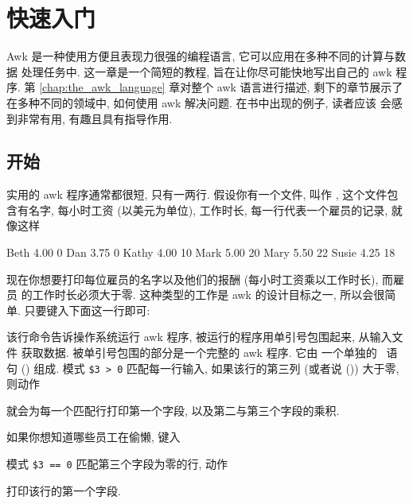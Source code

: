 
\chapter{快速入门}
\label{chap:an_awk_tutorial}

Awk 是一种使用方便且表现力很强的编程语言, 它可以应用在多种不同的计算与数据
处理任务中. 这一章是一个简短的教程, 旨在让你尽可能快地写出自己的 awk 程序.
第 \ref{chap:the_awk_language} 章对整个 awk 语言进行描述, 剩下的章节展示了
在多种不同的领域中, 如何使用 awk 解决问题. 在书中出现的例子, 读者应该
会感到非常有用, 有趣且具有指导作用.

\section{开始}
\label{sec:getting_started}

实用的 awk 程序通常都很短, 只有一两行. 假设你有一个文件, 叫作
, 这个文件包含有名字, 每小时工资 (以美元为单位),
工作时长, 每一行代表一个雇员的记录, 就像这样
\begin{file}
    Beth    4.00    0
    Dan     3.75    0
    Kathy   4.00    10
    Mark    5.00    20
    Mary    5.50    22
    Susie   4.25    18
\end{file}
现在你想要打印每位雇员的名字以及他们的报酬 (每小时工资乘以工作时长), 而雇员
的工作时长必须大于零. 这种类型的工作是 awk 的设计目标之一, 所以会很简单.
只要键入下面这一行即可:
该行命令告诉操作系统运行 awk 程序, 被运行的程序用单引号包围起来, 从输入文件
 获取数据. 被单引号包围的部分是一个完整的 awk 程序. 它由
一个单独的 \ 语句
() 组成.
模式 \verb'$3 > 0' 匹配每一行输入, 如果该行的第三列 (或者说 
()) 大于零, 则动作
就会为每一个匹配行打印第一个字段, 以及第二与第三个字段的乘积.

如果你想知道哪些员工在偷懒, 键入
模式 \verb'$3 == 0' 匹配第三个字段为零的行, 动作
打印该行的第一个字段.

